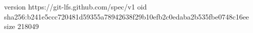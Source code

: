version https://git-lfs.github.com/spec/v1
oid sha256:b241e5ccc720481d59355a78942638f29b10efb2c0edaba2b535fbe0748c16ee
size 218049

